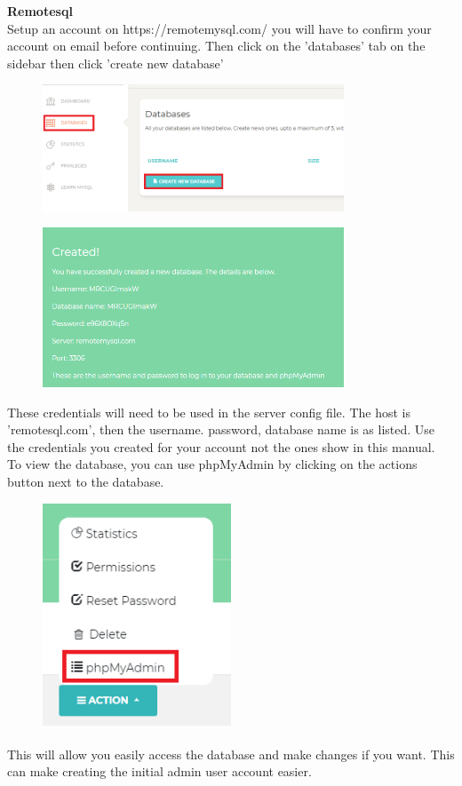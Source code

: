 \documentclass[12pt]{article}
\begin{document}
\noindent
\textbf{Remotesql}\\
\noindent
Setup an account on https://remotemysql.com/ you will have to confirm your account on email before continuing. Then click on the 'databases' tab on the sidebar then click 'create new database'
\begin{figure}[H]
    \centering
    \includegraphics[width=0.8\textwidth]{deploy/databasecreate.png}
\end{figure}
\begin{figure}[H]
    \centering
    \includegraphics[width=0.8\textwidth]{deploy/created.png}
    \label{fig1}
\end{figure}
\noindent
These credentials will need to be used in the server config file. The host is 'remotesql.com', then the username. password, database name is as listed. Use the credentials you created for your account not the ones show in this manual.\\
\noindent
To view the database, you can use phpMyAdmin by clicking on the actions button next to the database.
\begin{figure}[H]
    \centering
    \includegraphics[width=0.5\textwidth]{deploy/admin.png}
\end{figure}
\noindent
This will allow you easily access the database and make changes if you want. This can make creating the initial admin user account easier.\\ 
\end{document}
